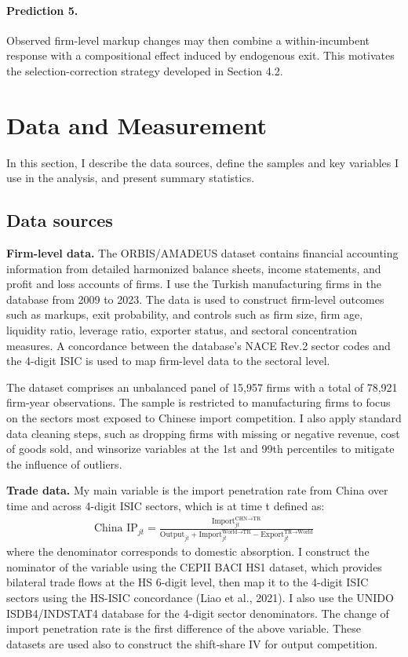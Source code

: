 \documentclass[12pt]{article}
\begin{document}
\paragraph{Prediction 5.} Observed firm-level markup changes may then combine a within-incumbent response with a compositional effect induced by endogenous exit. This motivates the selection-correction strategy developed in Section 4.2.

\section{Data and Measurement}
In this section, I describe the data sources, define the samples and key variables I use in the analysis, and present summary statistics.

\subsection{Data sources}
\textbf{Firm-level data.}  The ORBIS/AMADEUS dataset contains financial accounting information from detailed harmonized balance sheets, income statements, and profit and loss accounts of firms. I use the Turkish manufacturing firms in the database from 2009 to 2023. The data is used to construct firm-level outcomes such as markups, exit probability, and controls such as firm size, firm age, liquidity ratio, leverage ratio, exporter status, and sectoral concentration measures. A concordance between the database's NACE Rev.2 sector codes and the 4-digit ISIC is used to map firm-level data to the sectoral level.

The dataset comprises an unbalanced panel of 15,957 firms with a total of 78,921 firm-year observations. The sample is restricted to manufacturing firms to focus on the sectors most exposed to Chinese import competition. I also apply standard data cleaning steps, such as dropping firms with missing or negative revenue, cost of goods sold, and winsorize variables at the 1st and 99th percentiles to mitigate the influence of outliers.

\textbf{Trade data.} My main variable is the import penetration rate from China over time and across 4-digit ISIC sectors, which is at time t defined as: 
\begin{equation}
    \begin{aligned}
    \text{China IP}_{jt} = \frac{\text{Import}_{jt}^{\text{CHN} \to \text{TR}}}{\text{Output}_{jt} + \text{Import}_{jt}^{\text{World} \to \text{TR}} - \text{Export}_{jt}^{\text{TR} \to \text{World}}} 
\end{aligned}
\end{equation}
where the denominator corresponds to domestic absorption. I construct the nominator of the variable using the CEPII BACI HS1 dataset, which provides bilateral trade flows at the HS 6-digit level, then map it to the 4-digit ISIC sectors using the HS-ISIC concordance (Liao et al., 2021). I also use the UNIDO ISDB4/INDSTAT4 database for the 4-digit sector denominators. The change of import penetration rate is the first difference of the above variable. These datasets are used also to construct the shift-share IV for output competition.
\end{document}
